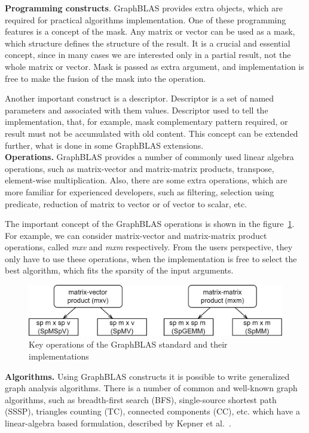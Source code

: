 \textbf{Programming constructs}. GraphBLAS provides extra objects, which are required for practical algorithms implementation. One of these programming features is a concept of the mask. Any matrix or vector can be used as a mask, which structure defines the structure of the result. It is a crucial and essential concept, since in many cases we are interested only in a partial result, not the whole matrix or vector. Mask is passed as extra argument, and implementation is free to make the fusion of the mask into the operation.

Another important construct is a descriptor. Descriptor is a set of named parameters and associated with them values. Descriptor used to tell the implementation, that, for example, mask complementary pattern required, or result must not be accumulated with old content. This concept can be extended further, what is done in some GraphBLAS extensions.\\

\textbf{Operations.} GraphBLAS provides a number of commonly used linear algebra operations, such as matrix-vector and matrix-matrix products, transpose, element-wise multiplication. Also, there are some extra operations, which are more familiar for experienced developers, such as filtering, selection using predicate, reduction of matrix to vector or of vector to scalar, etc.

The important concept of the GraphBLAS operations is shown in the figure~\ref{fig:gb_ops}. For example, we can consider matrix-vector and matrix-matrix product operations, called \textit{mxv} and \textit{mxm} respectively. From the users perspective, they only have to use these operations, when the implementation is free to select the best algorithm, which fits the sparsity of the input arguments.\\

\begin{figure}[h]
    \centering
    \includegraphics[width=1.0\textwidth]{images/types_of_operations.png}
    \caption{Key operations of the GraphBLAS standard and their implementations}
    \label{fig:gb_ops}
\end{figure}

\textbf{Algorithms.} Using GraphBLAS constructs it is possible to write generalized graph analysis algorithms. There is a number of common and well-known graph algorithms, such as breadth-first search (BFS), single-source shortest path (SSSP), triangles counting (TC), connected components (CC), etc. which have a linear-algebra based formulation, described by Kepner et al.~\cite{misc:la_graph}.

